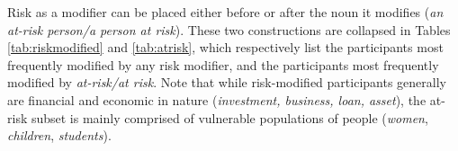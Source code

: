     Risk as a modifier can be placed either before or after the noun it modifies (\emph{an at-risk person\slash a person at risk}). These two constructions are collapsed in Tables \ref{tab:riskmodified} and \ref{tab:atrisk}, which respectively list the participants most frequently modified by any risk modifier, and the participants most frequently modified by \emph{at-risk\slash at risk}. Note that while risk-modified participants generally are financial and economic in nature (\emph{investment, business, loan, asset}), the at-risk subset is mainly comprised of vulnerable populations of people (\emph{women}, \emph{children}, \emph{students}).

    \begin{table}[htb!]
    \centering
\end{table}

